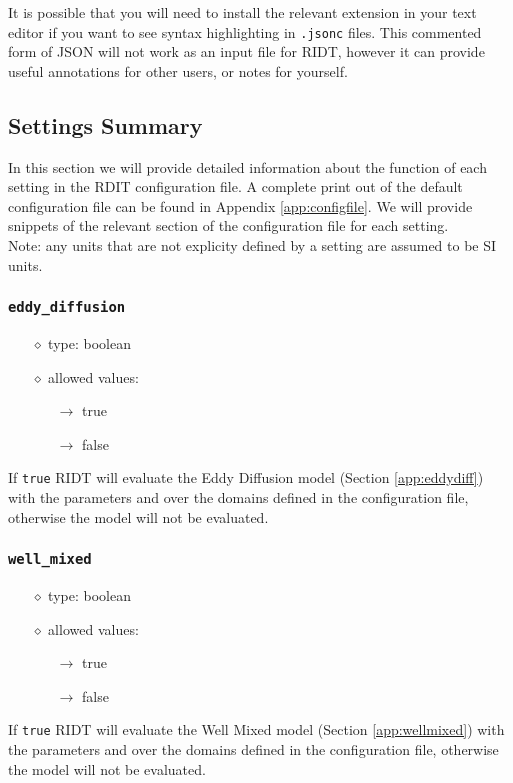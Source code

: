 \documentclass[]{article}
\def\code#1{\texttt{#1}}
\begin{document}
\noindent It is possible that you will need to install the relevant extension in
your text editor if you want to see syntax highlighting in \code{.jsonc} files.
This commented form of JSON will not work as an input file for RIDT,
however it can provide useful annotations for other users, or notes for
yourself. 


\subsection{Settings Summary}
In this section we will provide detailed information about the function of each
setting in the RDIT configuration file. A complete print out of the default
configuration file can be found in Appendix \ref{app:configfile}. We will
provide snippets of the relevant section of the configuration file for each
setting.\\

\noindent Note: any units that are not explicity defined by a setting are
assumed to be SI units.

\subsubsection{\code{eddy\_diffusion}}
\begin{itemize}
    \item[$\diamond$] type: boolean
    \item[$\diamond$] allowed values:
    \begin{itemize}
        \item[$\rightarrow$] true
        \item[$\rightarrow$] false
    \end{itemize}
\end{itemize}
If \code{true} RIDT will evaluate the Eddy Diffusion model (Section
\ref{app:eddydiff}) with the parameters and over the domains defined in
the configuration file, otherwise the model will not be evaluated.

\subsubsection{\code{well\_mixed}}
\begin{itemize}
    \item[$\diamond$] type: boolean
    \item[$\diamond$] allowed values:
    \begin{itemize}
        \item[$\rightarrow$] true
        \item[$\rightarrow$] false
    \end{itemize}
\end{itemize}
If \code{true} RIDT will evaluate the Well Mixed model (Section
\ref{app:wellmixed}) with the parameters and over the domains defined in the
configuration file, otherwise the model will not be evaluated.
\end{document}
